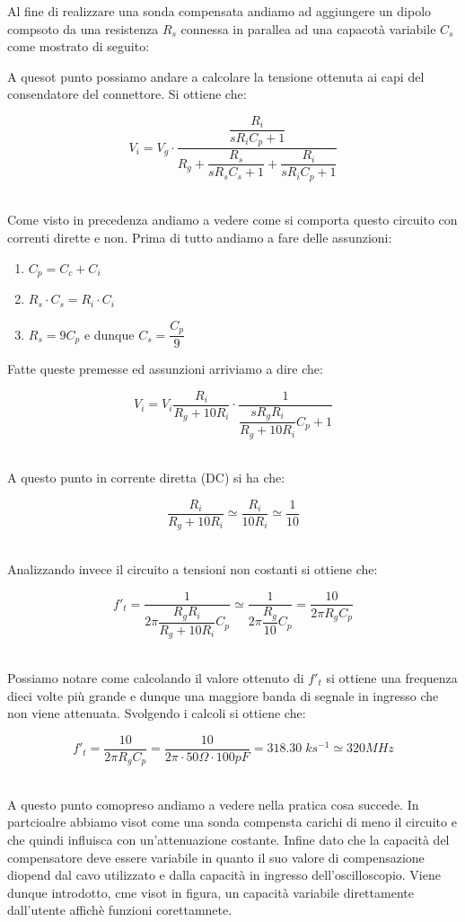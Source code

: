 \documentclass[../main.tex]{subfiles}
\begin{document}
Al fine di realizzare una sonda compensata andiamo ad aggiungere un dipolo compsoto da una resistenza $R_s$ connessa in parallea ad una capacotà variabile $C_s$ come mostrato di seguito:


A quesot punto possiamo andare a calcolare la tensione ottenuta ai capi del consendatore del connettore. Si ottiene che:

\[ V_i = V_g \cdot \frac{\dfrac{R_i}{sR_iC_p + 1}}{R_g + \dfrac{R_s}{sR_sC_s + 1} + \dfrac{R_i}{sR_iC_p + 1}}\]\

Come visto in precedenza andiamo a vedere come si comporta questo circuito con correnti dirette e non. Prima di tutto andiamo a fare delle assunzioni:

\begin{enumerate}
	\item[\textbf{-}] $C_p = C_c + C_i $
	\item[\textbf{-}] $R_s \cdot C_s = R_i \cdot C_i $
	\item[\textbf{-}] $R_s = 9C_p$ e dunque $C_s = \dfrac{C_p}{9}$	
	
\end{enumerate}

Fatte queste premesse ed assunzioni arriviamo a dire che:

\[ V_i = V_i \dfrac{R_i}{R_g + 10R_i}  \cdot \dfrac{1}{\dfrac{s R_gR_i}{R_g + 10R_i}C_p + 1} \]\


A questo punto in corrente diretta (DC) si ha che:

\[ \dfrac{R_i}{R_g + 10R_i}  \simeq \dfrac{R_i}{10R_i} \simeq \frac{1}{10} \]\

Analizzando invece il circuito a tensioni non costanti si ottiene che:

\[ f'_t = \frac{1}{2\pi \dfrac{R_gR_i}{R_g + 10R_i}C_p } \simeq \frac{1}{2\pi \dfrac{R_g}{10}C_p }  = \frac{10}{2\pi R_g C_p} \]\

Possiamo notare come calcolando il valore ottenuto di $f'_t$ si ottiene una frequenza dieci volte più grande e dunque una maggiore banda di segnale in ingresso che non viene attenuata.
Svolgendo i calcoli si ottiene che:


\[ f'_t = \frac{10}{2\pi R_g C_p} = \frac{10}{2\pi \cdot 50 \Omega \cdot 100 \unit{pF}} = 318.30\; \unit{ks^{-1}} \simeq 320 \unit{MHz} \]\

A questo punto comopreso andiamo a vedere nella pratica cosa succede. In partcioalre abbiamo visot come una sonda compensta carichi di meno il circuito e che quindi influisca con un'attenuazione costante. Infine dato che la capacità del compensatore deve essere variabile in quanto il suo valore di compensazione diopend dal cavo utilizzato e dalla capacità in ingresso dell'oscilloscopio. Viene dunque introdotto, cme visot in figura, un capacità variabile direttamente dall'utente affichè funzioni corettamnete.
\end{document}
